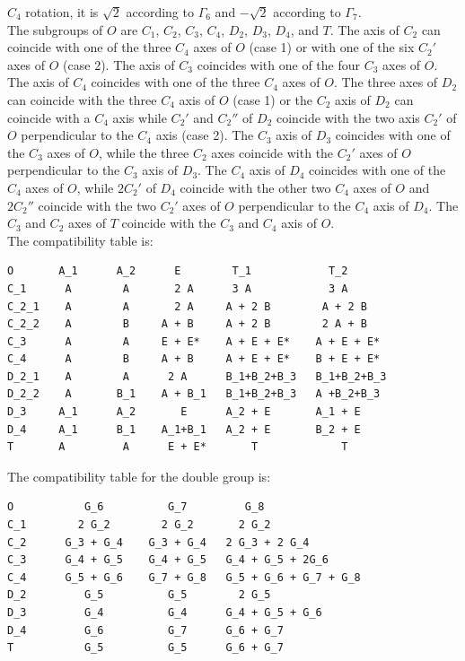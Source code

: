 \documentclass[12pt,a4paper]{article}
\begin{document}
$C_4$ rotation, it is $\sqrt{2}$ according to $\Gamma_6$ and $-\sqrt{2}$
according to $\Gamma_7$. \\
The subgroups of $O$ are $C_1$, $C_2$, $C_3$, $C_4$, $D_2$, $D_3$, $D_4$, and 
$T$. The axis of $C_2$ can coincide with one of the three $C_4$ axes of $O$
(case 1) or with one of the six $C_2'$ axes of $O$ (case 2). The axis of $C_3$ 
coincides with one of the four $C_3$ axes of $O$. The axis of $C_4$ 
coincides with one of the three $C_4$ axes of $O$. The three axes of $D_2$
can coincide with the three $C_4$ axis of $O$ (case 1) or the $C_2$ axis of
$D_2$ can coincide with a $C_4$ axis while $C_2'$ and $C_2''$ of $D_2$ 
coincide with the two axis $C_2'$ of $O$ perpendicular to the $C_4$ axis 
(case 2). The $C_3$ axis of $D_3$ coincides with one of the $C_3$ axes of $O$, while
the three $C_2$ axes coincide with the $C_2'$ axes of $O$ perpendicular to
the $C_3$ axis of $D_3$. The $C_4$ axis of $D_4$ coincides with one of the $C_4$
axes of $O$, while $2C_2'$ of $D_4$ coincide with the other two $C_4$ 
axes of $O$ and $2C_2''$ coincide with the two $C_2'$ axes of $O$ perpendicular
to the $C_4$ axis of $D_4$. The $C_3$ and $C_2$ axes of $T$ coincide with
the $C_3$ and $C_4$ axis of $O$. \\
The compatibility table is:
\begin{verbatim}
O       A_1      A_2      E        T_1            T_2
C_1      A        A       2 A      3 A            3 A
C_2_1    A        A       2 A     A + 2 B        A + 2 B
C_2_2    A        B     A + B     A + 2 B        2 A + B
C_3      A        A     E + E*    A + E + E*    A + E + E*
C_4      A        B     A + B     A + E + E*    B + E + E*
D_2_1    A        A      2 A      B_1+B_2+B_3   B_1+B_2+B_3 
D_2_2    A       B_1    A + B_1   B_1+B_2+B_3   A +B_2+B_3
D_3     A_1      A_2       E      A_2 + E       A_1 + E
D_4     A_1      B_1    A_1+B_1   A_2 + E       B_2 + E
T       A         A      E + E*       T             T
\end{verbatim}
The compatibility table for the double group is:
\begin{verbatim}
O           G_6          G_7         G_8
C_1        2 G_2        2 G_2       2 G_2
C_2      G_3 + G_4    G_3 + G_4   2 G_3 + 2 G_4
C_3      G_4 + G_5    G_4 + G_5   G_4 + G_5 + 2G_6  
C_4      G_5 + G_6    G_7 + G_8   G_5 + G_6 + G_7 + G_8
D_2         G_5          G_5        2 G_5
D_3         G_4          G_4      G_4 + G_5 + G_6
D_4         G_6          G_7      G_6 + G_7
T           G_5          G_5      G_6 + G_7 
\end{verbatim}
\end{document}
